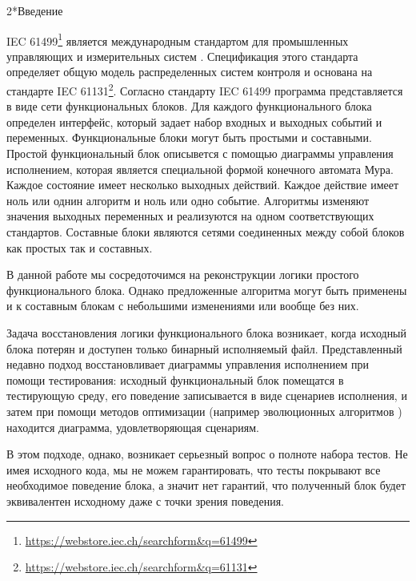 \documentclass[14pt]{extarticle}
\makeatletter
\theoremstyle{plain}
\theoremstyle{definition}
\renewcommand{\subsection}{\@startsection{subsection}{2}{0mm}%
{2\baselineskip}{\baselineskip}{\bfseries\large\itshape}}
\makeatother
\begin{document}
\pagebreak

\clearpage
\setcounter{page}{3}

\tableofcontents

\pagebreak

\subsection*{Введение}

IEC 61499\footnote{\url{https://webstore.iec.ch/searchform&q=61499}}
является международным стандартом для промышленных управляющих и
измерительных систем \cite{iec}. Спецификация этого стандарта определяет общую модель
распределенных систем контроля и основана на стандарте
IEC 61131\footnote{\url{https://webstore.iec.ch/searchform&q=61131}}. Согласно
стандарту IEC 61499 программа представляется в виде сети функциональных блоков.
Для каждого функционального блока определен интерфейс, который задает набор
входных и выходных событий и переменных. Функциональные блоки могут быть
простыми и составными. Простой функциональный блок описывется с помощью
диаграммы управления исполнением, которая является специальной формой конечного
автомата Мура. Каждое состояние имеет несколько выходных действий. Каждое
действие имеет ноль или однин алгоритм и ноль или одно событие. Алгоритмы
изменяют значения выходных переменных и реализуются на одном соответствующих
стандартов. Составные блоки являются сетями соединенных между собой блоков
как простых так и составных.

В данной работе мы сосредоточимся на реконструкции логики простого
функционального блока. Однако предложенные алгоритма могут быть применены и к
составным блокам с небольшими изменениями или вообще без них.

Задача восстановления логики функционального блока возникает, когда исходный
блока потерян и доступен только бинарный исполняемый файл. Представленный
недавно подход \cite{rec} восстановливает диаграммы управления исполнением при помощи
тестирования: исходный функциональный блок помещатся в тестирующую среду, его
поведение записывается в виде сценариев исполнения, и затем при помощи
методов оптимизации (например эволюционных алгоритмов \cite{ea}) находится диаграмма, удовлетворяющая сценариям.

В этом подходе, однако, возникает серьезный вопрос о полноте набора тестов.
Не имея исходного кода, мы не можем гарантировать, что тесты покрывают все
необходимое поведение блока, а значит нет гарантий, что полученный блок будет
эквивалентен исходному даже с точки зрения поведения.
\end{document}
